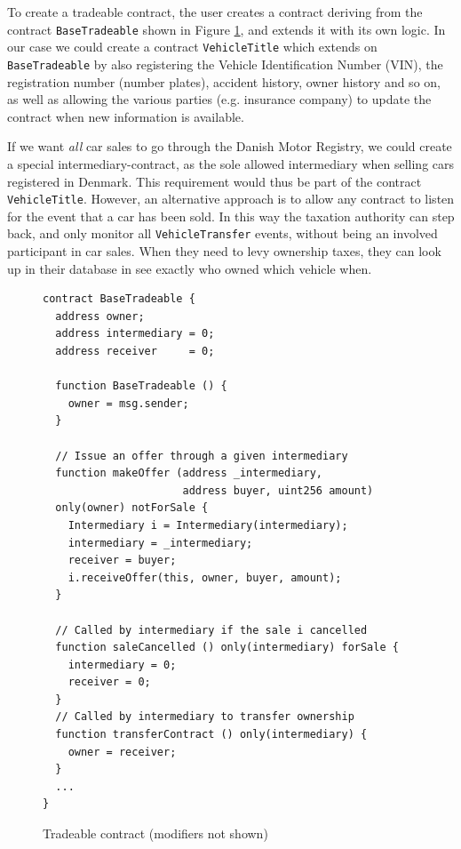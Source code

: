 \documentclass[oneside,a4paper,10pts,article]{memoir}
\begin{document}
To create a tradeable contract, the user creates a contract deriving
from the contract \texttt{BaseTradeable} shown in Figure
\ref{fig:tradeable}, and extends it with its own logic. In our case we
could create a contract \texttt{VehicleTitle} which extends on
\texttt{BaseTradeable} by also registering the Vehicle Identification
Number (VIN), the registration number (number plates), accident
history, owner history and so on, as well as allowing the various
parties (e.g. insurance company) to update the contract when new
information is available.

If we want \emph{all} car sales to go through the Danish Motor
Registry, we could create a special intermediary-contract, as the sole
allowed intermediary when selling cars registered in Denmark. This
requirement would thus be part of the contract
\texttt{VehicleTitle}. However, an alternative approach is to allow
any contract to listen for the event that a car has been sold. In this
way the taxation authority can step back, and only monitor all
\texttt{VehicleTransfer} events, without being an involved participant
in car sales. When they need to levy ownership taxes, they can look up
in their database in see exactly who owned which vehicle when.

\begin{figure}
\begin{lstlisting}
contract BaseTradeable {
  address owner;
  address intermediary = 0;
  address receiver     = 0;

  function BaseTradeable () {
    owner = msg.sender;
  }

  // Issue an offer through a given intermediary  
  function makeOffer (address _intermediary,
                      address buyer, uint256 amount)
  only(owner) notForSale {
    Intermediary i = Intermediary(intermediary);
    intermediary = _intermediary;
    receiver = buyer;
    i.receiveOffer(this, owner, buyer, amount);
  }

  // Called by intermediary if the sale i cancelled
  function saleCancelled () only(intermediary) forSale {
    intermediary = 0;
    receiver = 0;
  }
  // Called by intermediary to transfer ownership
  function transferContract () only(intermediary) {
    owner = receiver;
  }
  ...
}
\end{lstlisting}

\caption{Tradeable contract (modifiers not shown)}
\label{fig:tradeable}
\end{figure}
\end{document}
